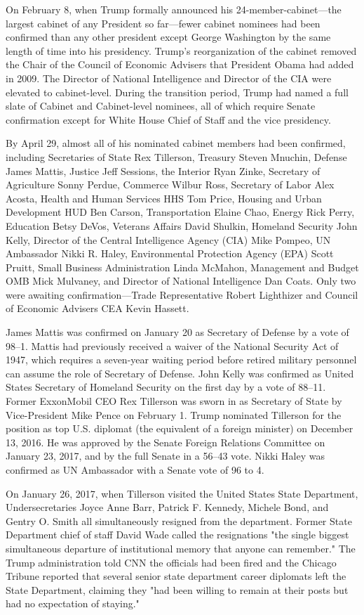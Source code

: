 On February 8, when Trump formally announced his 24-member-cabinet---the
largest cabinet of any President so far---fewer cabinet nominees had
been confirmed than any other president except George Washington by the
same length of time into his presidency. Trump's reorganization of the
cabinet removed the Chair of the Council of Economic Advisers that
President Obama had added in 2009. The Director of National Intelligence
and Director of the CIA were elevated to cabinet-level. During the
transition period, Trump had named a full slate of Cabinet and
Cabinet-level nominees, all of which require Senate confirmation except
for White House Chief of Staff and the vice presidency.

By April 29, almost all of his nominated cabinet members had been
confirmed, including Secretaries of State Rex Tillerson, Treasury Steven
Mnuchin, Defense James Mattis, Justice Jeff Sessions, the Interior Ryan
Zinke, Secretary of Agriculture Sonny Perdue, Commerce Wilbur Ross,
Secretary of Labor Alex Acosta, Health and Human Services HHS Tom Price,
Housing and Urban Development HUD Ben Carson, Transportation Elaine
Chao, Energy Rick Perry, Education Betsy DeVos, Veterans Affairs David
Shulkin, Homeland Security John Kelly, Director of the Central
Intelligence Agency (CIA) Mike Pompeo, UN Ambassador Nikki R. Haley,
Environmental Protection Agency (EPA) Scott Pruitt, Small Business
Administration Linda McMahon, Management and Budget OMB Mick Mulvaney,
and Director of National Intelligence Dan Coats. Only two were awaiting
confirmation---Trade Representative Robert Lighthizer and Council of
Economic Advisers CEA Kevin Hassett.

James Mattis was confirmed on January 20 as Secretary of Defense by a
vote of 98--1. Mattis had previously received a waiver of the National
Security Act of 1947, which requires a seven-year waiting period before
retired military personnel can assume the role of Secretary of Defense.
John Kelly was confirmed as United States Secretary of Homeland Security
on the first day by a vote of 88--11. Former ExxonMobil CEO Rex
Tillerson was sworn in as Secretary of State by Vice-President Mike
Pence on February 1. Trump nominated Tillerson for the position as top
U.S. diplomat (the equivalent of a foreign minister) on December 13,
2016. He was approved by the Senate Foreign Relations Committee on
January 23, 2017, and by the full Senate in a 56--43 vote. Nikki Haley
was confirmed as UN Ambassador with a Senate vote of 96 to 4.

On January 26, 2017, when Tillerson visited the United States State
Department, Undersecretaries Joyce Anne Barr, Patrick F. Kennedy,
Michele Bond, and Gentry O. Smith all simultaneously resigned from the
department. Former State Department chief of staff David Wade called the
resignations "the single biggest simultaneous departure of institutional
memory that anyone can remember." The Trump administration told CNN the
officials had been fired and the Chicago Tribune reported that several
senior state department career diplomats left the State Department,
claiming they "had been willing to remain at their posts but had no
expectation of staying."

